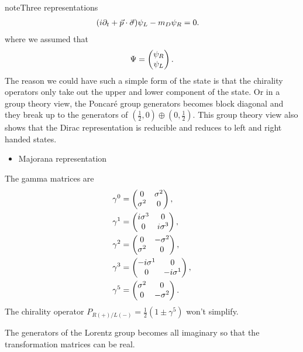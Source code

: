 \documentclass[letterpaper,12pt,english]{sphinxmanual}
\begin{document}
\begin{notice}{note}{Three representations}
\begin{gather}
\begin{split}
(i\partial_t + \vec p \cdot \vec \sigma) \psi_L - m_D\psi_R &= 0.\end{split}\notag
\end{gather}
where we assumed that
\begin{gather}
\begin{split}\Psi = \begin{pmatrix}  \psi_R \\ \psi_L \end{pmatrix}.\end{split}\notag
\end{gather}
The reason we could have such a simple form of the state is that the chirality operators only take out the upper and lower component of the state. Or in a group theory view, the Poncaré group generators becomes block diagonal and they break up to the generators of \((\frac{1}{2},0)\oplus (0,\frac{1}{2})\). This group theory view also shows that the Dirac representation is reducible and reduces to left and right handed states.
\begin{itemize}
\item {} 
Majorana representation

\end{itemize}

The gamma matrices are
\begin{gather}
\begin{split}\gamma^0 & = \begin{pmatrix} 0 & \sigma^2 \\ \sigma^2 & 0  \end{pmatrix}, \\
\gamma^1 & = \begin{pmatrix} i\sigma^3 & 0 \\ 0 & i \sigma^3  \end{pmatrix}, \\
\gamma^2 & = \begin{pmatrix} 0 & - \sigma^2 \\ \sigma^2 & 0   \end{pmatrix}, \\
\gamma^3 & = \begin{pmatrix} -i\sigma^1 & 0 \\ 0 & -i\sigma^1 \end{pmatrix}, \\
\gamma^5 & = \begin{pmatrix} \sigma^2 & 0 \\ 0 & -\sigma^2 \end{pmatrix}.\end{split}\notag
\end{gather}
The chirality operator \(P_{R(+)/L(-)} = \frac{1}{2}(1\pm \gamma^5)\) won't simplify.

The generators of the Lorentz group becomes all imaginary so that the transformation matrices can be real.
\end{notice}
\end{document}
